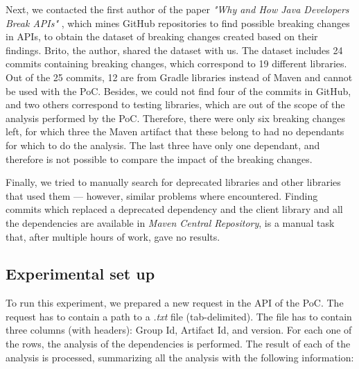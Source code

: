 Next, we contacted the first author of the paper \textit{"Why and How Java Developers Break APIs"} \cite{Brito2018}, which mines GitHub repositories to find possible breaking changes in APIs, to obtain the dataset of breaking changes created based on their findings. Brito, the author, shared the dataset with us. The dataset includes 24 commits containing breaking changes, which correspond to 19 different libraries. Out of the 25 commits, 12 are from Gradle libraries instead of Maven and cannot be used with the PoC. Besides, we could not find four of the commits in GitHub, and two others correspond to testing libraries, which are out of the scope of the analysis performed by the PoC. Therefore, there were only six breaking changes left, for which three the Maven artifact that these belong to had no dependants for which to do the analysis. The last three have only one dependant, and therefore is not possible to compare the impact of the breaking changes.

Finally, we tried to manually search for deprecated libraries and other libraries that used them — however, similar problems where encountered. Finding commits which replaced a deprecated dependency and the client library and all the dependencies are available in \textit{Maven Central Repository}, is a manual task that, after multiple hours of work, gave no results.

\subsection{Experimental set up}
To run this experiment, we prepared a new request in the API of the PoC. The request has to contain a path to a \textit{.txt} file (tab-delimited). The file has to contain three columns (with headers): Group Id, Artifact Id, and version. For each one of the rows, the analysis of the dependencies is performed. The result of each of the analysis is processed, summarizing all the analysis with the following information:


